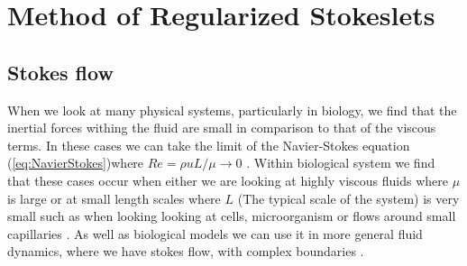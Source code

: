 \section{Method of Regularized Stokeslets}
\subsection{Stokes flow}
When we look at many physical systems, particularly in biology, we find that the inertial forces withing the fluid are small in comparison to that of the viscous terms. In these cases we can take the limit of the Navier-Stokes equation (\cref{eq:NavierStokes})where $R e=\rho u L/\mu \to 0 $ \cite{Trombley2019BasicFlows}. Within biological system we find that these cases occur when either we are looking at highly viscous fluids where $\mu$ is large or at small length scales where $L$ (The typical scale of the system) is very small such as when looking looking at cells, microorganism or flows around small capillaries \cite{Blake1972AOrganisms, Higdon1979APropulsion, Smith2009MathematicalFluids}. As well as biological models we can use it in more general fluid dynamics, where we have stokes flow, with complex boundaries \cite{Liron1978StokesPipe, Liron1976StokesPlates}.

